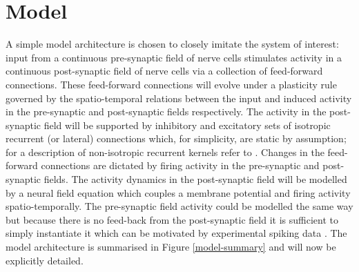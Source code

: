 \section{Model}
A simple model architecture is chosen to closely imitate the system of interest: input from a continuous pre-synaptic field of nerve cells stimulates activity in a continuous post-synaptic field of nerve cells via a collection of feed-forward connections. These feed-forward connections will evolve under a plasticity rule governed by the spatio-temporal relations between the input and induced activity in the pre-synaptic and post-synaptic fields respectively. The activity in the post-synaptic field will be supported by inhibitory and excitatory sets of isotropic recurrent (or lateral) connections which, for simplicity, are static by assumption; for a description of non-isotropic recurrent kernels refer to \cite{Graben2014-pm, Schwappach2015-jy}. Changes in the feed-forward connections are dictated by firing activity in the pre-synaptic and post-synaptic fields. The activity dynamics in the post-synaptic field will be modelled by a neural field equation which couples a membrane potential and firing activity spatio-temporally. The pre-synaptic field activity could be modelled the same way but because there is no feed-back from the post-synaptic field it is sufficient to simply instantiate it which can be motivated by experimental spiking data \cite{Meister1991-mu}. The model architecture is summarised in Figure \ref{model-summary} and will now be explicitly detailed.
